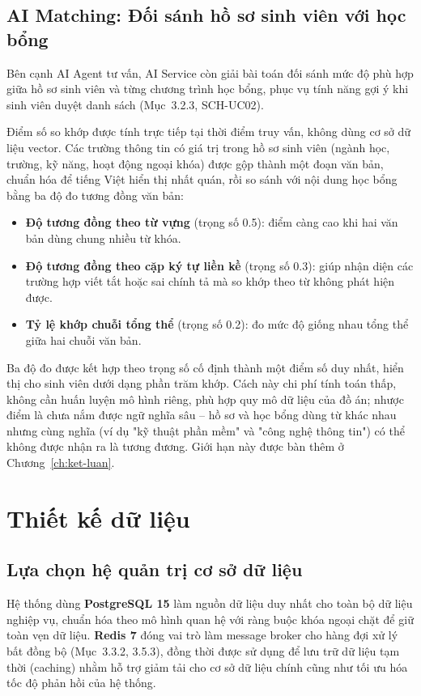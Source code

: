 \subsection{AI Matching: Đối sánh hồ sơ sinh viên với học bổng}
Bên cạnh AI Agent tư vấn, AI Service còn giải bài toán đối sánh mức độ phù hợp giữa hồ sơ sinh viên và từng chương trình học bổng, phục vụ tính năng gợi ý khi sinh viên duyệt danh sách (Mục~3.2.3, SCH-UC02).

Điểm số so khớp được tính trực tiếp tại thời điểm truy vấn, không dùng cơ sở dữ liệu vector. Các trường thông tin có giá trị trong hồ sơ sinh viên (ngành học, trường, kỹ năng, hoạt động ngoại khóa) được gộp thành một đoạn văn bản, chuẩn hóa để tiếng Việt hiển thị nhất quán, rồi so sánh với nội dung học bổng bằng ba độ đo tương đồng văn bản:
\begin{itemize}
    \item \textbf{Độ tương đồng theo từ vựng} \cite{jaccard1901} (trọng số 0.5): điểm càng cao khi hai văn bản dùng chung nhiều từ khóa.
    \item \textbf{Độ tương đồng theo cặp ký tự liền kề} \cite{cavnar1994-ngram} (trọng số 0.3): giúp nhận diện các trường hợp viết tắt hoặc sai chính tả mà so khớp theo từ không phát hiện được.
    \item \textbf{Tỷ lệ khớp chuỗi tổng thể} (trọng số 0.2): đo mức độ giống nhau tổng thể giữa hai chuỗi văn bản.
\end{itemize}
Ba độ đo được kết hợp theo trọng số cố định thành một điểm số duy nhất, hiển thị cho sinh viên dưới dạng phần trăm khớp. Cách này chi phí tính toán thấp, không cần huấn luyện mô hình riêng, phù hợp quy mô dữ liệu của đồ án; nhược điểm là chưa nắm được ngữ nghĩa sâu -- hồ sơ và học bổng dùng từ khác nhau nhưng cùng nghĩa (ví dụ "kỹ thuật phần mềm" và "công nghệ thông tin") có thể không được nhận ra là tương đương. Giới hạn này được bàn thêm ở Chương~\ref{ch:ket-luan}.

\section{Thiết kế dữ liệu}

\subsection{Lựa chọn hệ quản trị cơ sở dữ liệu}
Hệ thống dùng \textbf{PostgreSQL 15} \cite{postgresql-docs} làm nguồn dữ liệu duy nhất cho toàn bộ dữ liệu nghiệp vụ, chuẩn hóa theo mô hình quan hệ với ràng buộc khóa ngoại chặt để giữ toàn vẹn dữ liệu. \textbf{Redis 7} \cite{redis-docs} đóng vai trò làm message broker cho hàng đợi xử lý bất đồng bộ (Mục~3.3.2, 3.5.3), đồng thời được sử dụng để lưu trữ dữ liệu tạm thời (caching) nhằm hỗ trợ giảm tải cho cơ sở dữ liệu chính cũng như tối ưu hóa tốc độ phản hồi của hệ thống.

